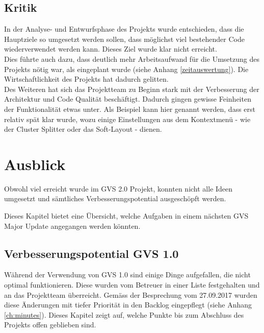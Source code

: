\documentclass[11pt,a4paper,english,oneside]{book}
\numberwithin{equation}{chapter}
\begin{document}
	
	\subsection{Kritik}
	In der Analyse- und Entwurfsphase des Projekts wurde entschieden, dass die Hauptziele so umgesetzt werden sollen, dass möglichst viel bestehender Code wiederverwendet werden kann. Dieses Ziel wurde klar nicht erreicht.\\
	Dies führte auch dazu, dass deutlich mehr Arbeitsaufwand für die Umsetzung des Projekts nötig war, als eingeplant wurde (siehe Anhang \ref{zeitauswertung}). Die Wirtschaftlichkeit des Projekts hat dadurch gelitten.\\
	
	\noindent
	Des Weiteren hat sich das Projektteam zu Beginn stark mit der Verbesserung der Architektur und Code Qualität beschäftigt. Dadurch gingen gewisse Feinheiten der Funktionalität etwas unter. Als Beispiel kann hier genannt werden, dass erst relativ spät klar wurde, wozu einige Einstellungen aus dem Kontextmenü - wie der Cluster Splitter oder das Soft-Layout - dienen.



	\section{Ausblick}
	\label{sec:ausblick}
	Obwohl viel erreicht wurde im GVS 2.0 Projekt, konnten nicht alle Ideen umgesetzt und sämtliches Verbesserungspotential ausgeschöpft werden.
	
	\noindent
	Dieses Kapitel bietet eine Übersicht, welche Aufgaben in einem nächsten GVS Major Update angegangen werden könnten. 
	
	\subsection{Verbesserungspotential GVS 1.0}
	Während der Verwendung von GVS 1.0 sind einige Dinge aufgefallen, die nicht optimal funktionieren. Diese wurden vom Betreuer in einer Liste festgehalten und an das Projektteam überreicht. Gemäss der Besprechung vom 27.09.2017 wurden diese Änderungen mit tiefer Priorität in den Backlog eingepflegt (siehe Anhang \ref{ch:minutes}). Dieses Kapitel zeigt auf, welche Punkte bis zum Abschluss des Projekts offen geblieben sind.
	
\end{document}
